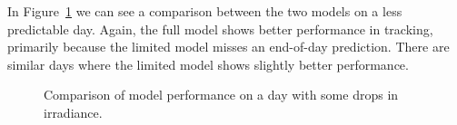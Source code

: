In Figure~\ref{fig:disc_med} we can see a comparison between the two models on a less predictable day. Again, the full model shows better performance in tracking, primarily because the limited model misses an end-of-day prediction. There are similar days where the limited model shows slightly better performance.
\begin{figure}[ht!]
    \centering
    \qquad
    \qquad
    \caption{Comparison of model performance on a day with some drops in irradiance.
    \label{fig:disc_med}}
\end{figure}

